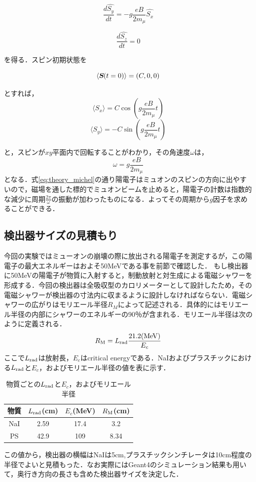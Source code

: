 \begin{equation}
\frac{d\hat{S_y}}{dt} = - g \frac{eB}{2m_\mu}\hat{S_x} 
\end{equation} 

\begin{equation}
\frac{d\hat{S_z}}{dt} = 0 
\end{equation} 

を得る．スピン初期状態を

\begin{equation}
\langle \textsl{\textbf {S}}(t=0)\rangle = (C,0,0)
\end{equation} 

とすれば，
\begin{equation}
\langle S_x \rangle= C\cos{(g\frac{eB}{2m_\mu}t)}
\end{equation}
\begin{equation}
\langle S_y \rangle= -C\sin{(g\frac{eB}{2m_\mu}t)}
\end{equation}

と，スピンが$xy$平面内で回転することがわかり，その角速度$\omega$は，
\begin{equation}
\omega = g\frac{eB}{2m_\mu}
\end{equation}
となる．式\eqref{eq:theory_michel}の通り陽電子はミュオンのスピンの方向に出やすいので，磁場を通した標的でミュオンビームを止めると，陽電子の計数は指数的な減少に周期$\frac{2\pi}{\omega}$の振動が加わったものになる．よってその周期から$g$因子を求めることができる．
\subsection{検出器サイズの見積もり}
今回の実験ではミューオンの崩壊の際に放出される陽電子を測定するが，この陽電子の最大エネルギーはおよそ50MeVである事を前節で確認した．
もし検出器に50MeVの陽電子が物質に入射すると，制動放射と対生成による電磁シャワーを形成する．今回の検出器は全吸収型のカロリメーターとして設計したため，その電磁シャワーが検出器の寸法内に収まるように設計しなければならない．電磁シャワーの広がりはモリエール半径$R_M$によって記述される．具体的にはモリエール半径の内部にシャワーのエネルギーの90％が含まれる．モリエール半径は次のように定義される．
\begin{equation}
R_{\rm M} = L_{\rm rad}\frac{21.2{\rm (MeV)}}{E_c}
\end{equation}
ここで$L_{\rm rad}$は放射長，$E_c$はcritical energyである．NaIおよびプラスチックにおける$L_{\rm rad}$と$E_c$，およびモリエール半径の値を表に示す．
\begin{table}[b]
\centering
  \begin{tabular}{cccc}
    物質 & $L_{\rm rad}$(cm) & $E_c$(MeV) & $R_{\rm M}$(cm) \\\hline \hline
    NaI & 2.59 & 17.4 & 3.2 \\
    PS & 42.9 & 109 & 8.34 \\
  \end{tabular}
  \caption{物質ごとの$L_{\rm rad}$と$E_c$，およびモリエール半径}
\end{table}
この値から，検出器の横幅はNaIは5cm,プラスチックシンチレータは10cm程度の半径でよいと見積もった．なお実際にはGeant4のシミュレーション結果も用いて，奥行き方向の長さも含めた検出器サイズを決定した．
\newpage

